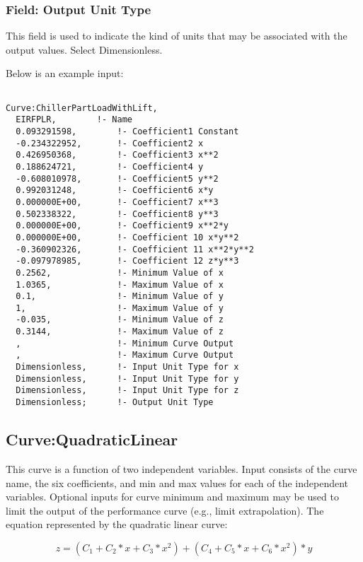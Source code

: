 \subsubsection{Field: Output Unit Type}\label{field-output-unit-type-8}

This field is used to indicate the kind of units that may be associated with the output values. Select Dimensionless.

Below is an example input:

\begin{lstlisting}

Curve:ChillerPartLoadWithLift,
  EIRFPLR,        !- Name
  0.093291598,        !- Coefficient1 Constant
  -0.234322952,       !- Coefficient2 x
  0.426950368,        !- Coefficient3 x**2
  0.188624721,        !- Coefficient4 y
  -0.608010978,       !- Coefficient5 y**2
  0.992031248,        !- Coefficient6 x*y
  0.000000E+00,       !- Coefficient7 x**3
  0.502338322,        !- Coefficient8 y**3
  0.000000E+00,       !- Coefficient9 x**2*y
  0.000000E+00,       !- Coefficient 10 x*y**2
  -0.360902326,       !- Coefficient 11 x**2*y**2
  -0.097978985,       !- Coefficient 12 z*y**3
  0.2562,             !- Minimum Value of x
  1.0365,             !- Maximum Value of x
  0.1,                !- Minimum Value of y
  1,                  !- Maximum Value of y
  -0.035,             !- Minimum Value of z
  0.3144,             !- Maximum Value of z
  ,                   !- Minimum Curve Output
  ,                   !- Maximum Curve Output
  Dimensionless,      !- Input Unit Type for x
  Dimensionless,      !- Input Unit Type for y
  Dimensionless,      !- Input Unit Type for z
  Dimensionless;      !- Output Unit Type
\end{lstlisting}

\subsection{Curve:QuadraticLinear}\label{curvequadraticlinear}

This curve is a function of two independent variables. Input consists of the curve name, the six coefficients, and min and max values for each of the independent variables. Optional inputs for curve minimum and maximum may be used to limit the output of the performance curve (e.g., limit extrapolation). The equation represented by the quadratic linear curve:

\begin{equation}
z = \left( {{C_1} + {C_2}*x + {C_3}*{x^2}} \right) + \left( {{C_4} + {C_5}*x + {C_6}*{x^2}} \right)*y
\end{equation}

